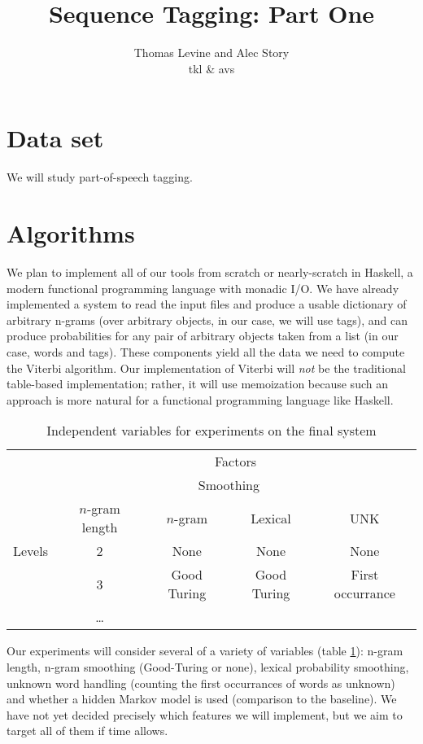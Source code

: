 \documentclass{article}
\title{Sequence Tagging: Part One}
\author{Thomas Levine and Alec Story\\\small{tkl\osn{22} \& avs\osn{38}}}
\begin{document}
\maketitle
\section{Data set}
We will study part-of-speech tagging.
\section{Algorithms}

We plan to implement all of our tools from scratch or nearly-scratch in Haskell,
a modern functional programming language with monadic I/O.  We have already
implemented a system to read the input files and produce a usable dictionary of
arbitrary n-grams (over arbitrary objects, in our case, we will use tags), and
can produce probabilities for any pair of arbitrary objects taken from a list
(in our case, words and tags).  These components yield all the data we need to
compute the Viterbi algorithm.  Our implementation of Viterbi will \emph{not} be
the traditional table-based implementation; rather, it will use memoization
because such an approach is more natural for a functional programming language
like Haskell.

\begin{table}
\begin{tabular}{lcccc}
\toprule
& \multicolumn{4}{c}{Factors} \\
\cmidrule{2-5}
& & \multicolumn{2}{c}{Smoothing} \\
\cmidrule{3-4}
       & $n$-gram length & $n$-gram & Lexical & UNK\\
\cmidrule{2-5}
Levels &  2  & None        & None        & None \\
       &  3  & Good Turing & Good Turing & First occurrance  \\
       &  \ldots  &             &             &      \\
\bottomrule
\end{tabular}
\caption{\label{tab:ind_vars}Independent variables for experiments on the final system}
\end{table}

Our experiments will consider several of a variety of variables (table \ref{tab:ind_vars}): n-gram length,
n-gram smoothing (Good-Turing or none), lexical probability smoothing, unknown
word handling (counting the first occurrances of words as unknown) and
whether a hidden Markov model is used (comparison to the baseline).
We have not yet decided precisely which features we will implement, but we
aim to target all of them if time allows.
\end{document}
